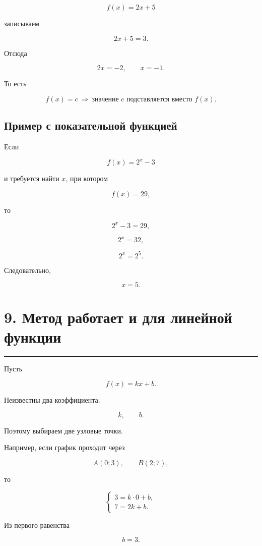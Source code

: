 \documentclass[a4paper,12pt]{article}
\newcommand{\sectionline}{%
    \vspace{0.2em}
    {\color{accent}\rule{\linewidth}{0.7pt}}
    \vspace{0.45em}
}
\begin{document}
\[
f(x)=2x+5
\]

записываем

\[
2x+5=3.
\]

Отсюда

\[
2x=-2,
\qquad
x=-1.
\]

То есть

\[
\boxed{f(x)=c\ \Rightarrow\ \text{значение }c
\text{ подставляется вместо }f(x).}
\]

\subsection*{\textcolor{accent}{Пример с показательной функцией}}

Если

\[
f(x)=2^x-3
\]

и требуется найти \(x\), при котором

\[
f(x)=29,
\]

то

\[
2^x-3=29,
\]

\[
2^x=32,
\]

\[
2^x=2^5.
\]

Следовательно,

\[
\boxed{x=5}.
\]


\section*{\textcolor{darkaccent}{9. Метод работает и для линейной функции}}

\sectionline

Пусть

\[
f(x)=kx+b.
\]

Неизвестны два коэффициента:

\[
k,\qquad b.
\]

Поэтому выбираем две узловые точки.

Например, если график проходит через

\[
A(0;3),
\qquad
B(2;7),
\]

то

\[
\begin{cases}
3=k\cdot0+b,\\
7=2k+b.
\end{cases}
\]

Из первого равенства

\[
b=3.
\]
\end{document}
